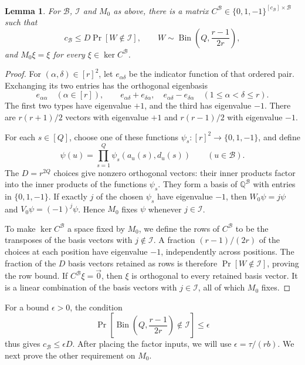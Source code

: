 \documentclass[11pt,reqno]{amsart}
\numberwithin{equation}{section}
\newtheorem{lemma}[theorem]{Lemma}
\theoremstyle{definition}\newtheorem{definition}[theorem]{Definition}
\theoremstyle{remark}\newtheorem{remark}[theorem]{Remark}
\renewcommand{\le}{\leqslant}
\begin{document}
\begin{lemma}\label{lem:swaps-matrix}
For $\mathcal B$, $\mathcal I$ and $M_0$ as above, there is a matrix
$C^{\mathcal B}\in\{0,1,-1\}^{[c_{\mathcal B}]\times\mathcal B}$ such that
\[
 c_{\mathcal B}\le D\Pr[W\notin\mathcal I],\qquad
 W\sim\operatorname{Bin}\!\left(Q,\frac{r-1}{2r}\right),
\]
and $M_0\xi=\xi$ for every $\xi\in\ker C^{\mathcal B}$.
\end{lemma}
\begin{proof}
For $(\alpha,\delta)\in[r]^2$, let $e_{\alpha\delta}$ be the
indicator function of that ordered pair. Exchanging its two entries
has the orthogonal eigenbasis
\[
 e_{\alpha\alpha}\quad(\alpha\in[r]),\qquad
 e_{\alpha\delta}+e_{\delta\alpha},\quad
 e_{\alpha\delta}-e_{\delta\alpha}\quad(1\le\alpha<\delta\le r).
\]
The first two types have eigenvalue $+1$, and the third has eigenvalue
$-1$. There are $r(r+1)/2$ vectors with eigenvalue $+1$ and
$r(r-1)/2$ with eigenvalue $-1$.

For each $s\in[Q]$, choose one of these functions
$\psi_s:[r]^2\to\{0,1,-1\}$, and define
\[
 \psi(u)=\prod_{s=1}^Q\psi_s(a_u(s),d_u(s))
 \qquad(u\in\mathcal B).
\]
The $D=r^{2Q}$ choices give nonzero orthogonal vectors: their inner
products factor into the inner products of the functions $\psi_s$.
They form a basis of $\mathbb Q^{\mathcal B}$ with entries in
$\{0,1,-1\}$. If exactly $j$ of the chosen $\psi_s$ have eigenvalue
$-1$, then $W_0\psi=j\psi$ and $V_0\psi=(-1)^j\psi$. Hence $M_0$
fixes $\psi$ whenever $j\in\mathcal I$.

To make $\ker C^{\mathcal B}$ a space fixed by $M_0$, we define
the rows of $C^{\mathcal B}$ to be the transposes of the basis
vectors with $j\notin\mathcal I$.
A fraction $(r-1)/(2r)$ of the choices at each
position have eigenvalue $-1$, independently across positions. The
fraction of the $D$ basis vectors retained as rows is therefore
$\Pr[W\notin\mathcal I]$, proving the row bound. If
$C^{\mathcal B}\xi=\vec{0}$, then $\xi$ is orthogonal to every retained
basis vector. It is a linear combination of the basis vectors with
$j\in\mathcal I$, all of which $M_0$ fixes.
\end{proof}

For a bound $\epsilon>0$, the condition
\begin{equation}\label{eq:incidence-tail}
 \Pr\!\left[\operatorname{Bin}\!\left(Q,\frac{r-1}{2r}\right)
                         \notin\mathcal I\right]\le\epsilon
\end{equation}
thus gives $c_{\mathcal B}\le\epsilon D$. After placing the factor
inputs, we will use $\epsilon=\tau/(rb)$. We next prove the other
requirement on $M_0$.
\end{document}
